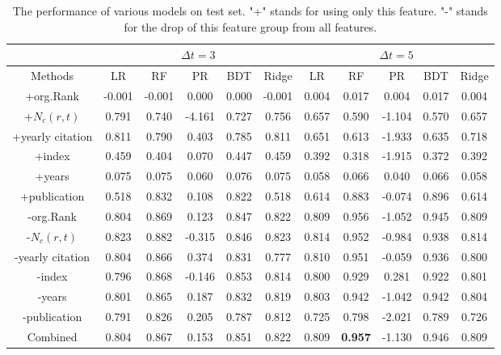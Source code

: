 \begin{table*}[t]
\begin{center}
\begin{tabular}{c|c|c|c|c|c|c|c|c|c|c}
\hline
& \multicolumn{5}{|c|}{\textbf{$\Delta t =3$}}& \multicolumn{5}{|c}{$\Delta t =5$}\\

\hline
Methods & LR & RF & PR & BDT & Ridge & LR & RF & PR & BDT & Ridge\\
\hline\hline
+org.Rank &-0.001 &-0.001 &0.000 &0.000 &-0.001 &0.004 &0.017 & 0.004 & 0.017 &0.004\\
\hline
+$N_c(r,t)$ & 0.791& 0.740& -4.161&0.727 &0.756 & 0.657 &	0.590 & -1.104 &0.570 &0.657\\
\hline
+yearly citation &0.811 &0.790 &0.403 &0.785 &0.811 & 0.651 &0.613 & -1.933 & 0.635 & 0.718\\
\hline
+index & 0.459&0.404 &0.070 &0.447 &0.459 &0.392 &0.318 &-1.915 & 0.372 &0.392\\
\hline
+years &0.075 &0.075 & 0.060&0.076 &0.075 &0.058 & 0.066 &0.040 & 0.066 & 0.058\\
\hline
+publication  &0.518 &0.832 &0.108 &0.822 & 0.518 & 0.614 &0.883 & -0.074 & 0.896 & 0.614\\
\hline\hline
-org.Rank &0.804 &0.869 &0.123 & 0.847&0.822 & 0.809 & 0.956 & -1.052 &0.945 & 0.809\\
\hline
-$N_c(r,t)$ &0.823 &0.882 &-0.315 &0.846 & 0.823 &0.814 &	0.952 & -0.984&0.938 & 0.814\\
\hline
-yearly citation &0.804 &0.866 & 0.374& 0.831&0.777 &0.810 & 0.951&-0.059 &0.936 &0.800\\
\hline
-index &0.796 &0.868 &-0.146 &0.853 & 0.814&0.800 & 0.929&0.281 &0.922 &0.801\\
\hline
-years &0.801 &0.865 &0.187 &0.832 & 0.819 &0.803 &0.942 & -1.042 & 0.942 &0.804\\
\hline
-publication & 0.791& 0.826& 0.205& 0.787&0.812 & 0.725 & 0.798 & -2.021 & 0.789 & 0.726\\
\hline\hline
Combined &0.804 &0.867 &0.153 &0.851 &0.822 &0.809&\textbf{0.957} &-1.130 &0.946 &0.809\\
\hline
\end{tabular}
\end{center}
\caption{The performance of various models on test set. "+" stands for using only this feature. "-" stands for the drop of this feature group from all features.}
\label{tbl-r2}

\end{table*}
